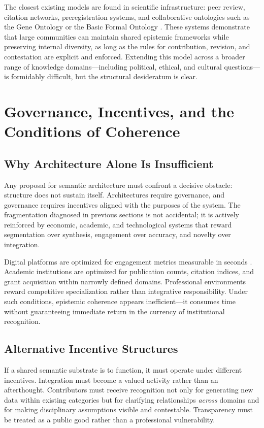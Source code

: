 \documentclass[12pt]{article}
\begin{document}
The closest existing models are found in scientific infrastructure: peer review, citation networks, preregistration systems, and collaborative ontologies such as the Gene Ontology or the Basic Formal Ontology \citep{Smith2007}. These systems demonstrate that large communities can maintain shared epistemic frameworks while preserving internal diversity, as long as the rules for contribution, revision, and contestation are explicit and enforced. Extending this model across a broader range of knowledge domains---including political, ethical, and cultural questions---is formidably difficult, but the structural desideratum is clear.

\section{Governance, Incentives, and the Conditions of Coherence}
\label{sec:governance}

\subsection{Why Architecture Alone Is Insufficient}

Any proposal for semantic architecture must confront a decisive obstacle: structure does not sustain itself. Architectures require governance, and governance requires incentives aligned with the purposes of the system. The fragmentation diagnosed in previous sections is not accidental; it is actively reinforced by economic, academic, and technological systems that reward segmentation over synthesis, engagement over accuracy, and novelty over integration.

Digital platforms are optimized for engagement metrics measurable in seconds \citep{Zuboff2019}. Academic institutions are optimized for publication counts, citation indices, and grant acquisition within narrowly defined domains. Professional environments reward competitive specialization rather than integrative responsibility. Under such conditions, epistemic coherence appears inefficient---it consumes time without guaranteeing immediate return in the currency of institutional recognition.

\subsection{Alternative Incentive Structures}

If a shared semantic substrate is to function, it must operate under different incentives. Integration must become a valued activity rather than an afterthought. Contributors must receive recognition not only for generating new data within existing categories but for clarifying relationships \emph{across} domains and for making disciplinary assumptions visible and contestable. Transparency must be treated as a public good rather than a professional vulnerability.
\end{document}
